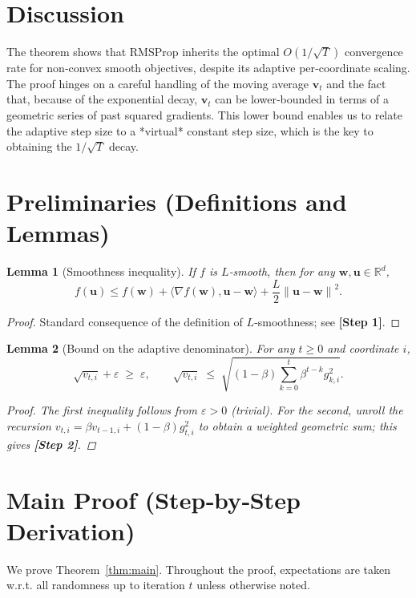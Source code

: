 \documentclass{article}
\newtheorem{lemma}{Lemma}
\newcommand{\norm}[1]{\left\|#1\right\|}
\newcommand{\ip}[2]{\langle #1,#2\rangle}
\begin{document}
\section*{Discussion}
The theorem shows that RMSProp inherits the optimal $O(1/\sqrt{T})$ convergence rate for non‑convex smooth objectives, despite its adaptive per‑coordinate scaling. The proof hinges on a careful handling of the moving average $\bm v_{t}$ and the fact that, because of the exponential decay, $\bm v_{t}$ can be lower‑bounded in terms of a geometric series of past squared gradients. This lower bound enables us to relate the adaptive step size to a *virtual* constant step size, which is the key to obtaining the $1/\sqrt{T}$ decay.

\newpage
\section*{Preliminaries (Definitions and Lemmas)}
\begin{lemma}[Smoothness inequality]\label{lem:smooth}
If $f$ is $L$‑smooth, then for any $\bm w,\bm u\in\mathbb{R}^{d}$,
\[
f(\bm u)\le f(\bm w)+\ip{\nabla f(\bm w)}{\bm u-\bm w}
+\frac{L}{2}\norm{\bm u-\bm w}^{2}.
\tag{L1}
\]
\end{lemma}
\begin{proof}
Standard consequence of the definition of $L$‑smoothness; see \textbf{[Step 1]}.
\end{proof}

\begin{lemma}[Bound on the adaptive denominator]\label{lem:denom}
For any $t\ge0$ and coordinate $i$,
\[
\sqrt{v_{t,i}}+\varepsilon\;\ge\;\varepsilon,\qquad
\sqrt{v_{t,i}}\;\le\;\sqrt{(1-\beta)\sum_{k=0}^{t}\beta^{t-k}g_{k,i}^{2}}.
\tag{L2}
\]
\begin{proof}
The first inequality follows from $\varepsilon>0$ (trivial).  
For the second, unroll the recursion $v_{t,i}= \beta v_{t-1,i}+(1-\beta)g_{t,i}^{2}$ to obtain a weighted geometric sum; this gives \textbf{[Step 2]}.
\end{proof}
\end{lemma}

\section*{Main Proof (Step‑by‑Step Derivation)}
We prove Theorem~\ref{thm:main}. Throughout the proof, expectations are taken w.r.t. all randomness up to iteration $t$ unless otherwise noted.
\end{document}
